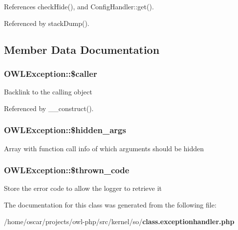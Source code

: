 References checkHide(), and ConfigHandler::get().



Referenced by stackDump().



\subsection{Member Data Documentation}
\subsubsection[{\$caller}]{\setlength{\rightskip}{0pt plus 5cm}OWLException::\$caller\hspace{0.3cm}{\ttfamily  [private]}}\label{classOWLException_af59d0890c1de1187f43084ec617545f1}
Backlink to the calling object 

Referenced by \_\-\_\-construct().

\subsubsection[{\$hidden\_\-args}]{\setlength{\rightskip}{0pt plus 5cm}OWLException::\$hidden\_\-args\hspace{0.3cm}{\ttfamily  [private]}}\label{classOWLException_a6f55c054dd20e494abe9db9a9494bdda}
Array with function call info of which arguments should be hidden 
\subsubsection[{\$thrown\_\-code}]{\setlength{\rightskip}{0pt plus 5cm}OWLException::\$thrown\_\-code}\label{classOWLException_abd34d579d5f578f2e08a04c987dbea1a}
Store the error code to allow the logger to retrieve it 

The documentation for this class was generated from the following file:\begin{DoxyCompactItemize}
\item 
/home/oscar/projects/owl-\/php/src/kernel/so/{\bf class.exceptionhandler.php}\end{DoxyCompactItemize}
